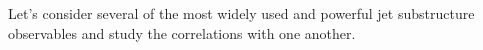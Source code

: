 Let's consider several of the most widely used and powerful jet substructure observables and study the correlations with one another.
